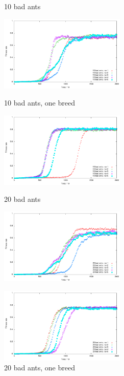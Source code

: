 \documentclass[titlepage, a4paper, 12pt]{article}
\begin{document}
\begin{figure}
  \begin{minipage}[b]{0.5\linewidth}
    \centering
    \caption{10 bad ants }\label{fig:images/graph10}
    \includegraphics[width=6cm]{images/graph10.pdf}
  \end{minipage}
  \begin{minipage}[b]{0.5\linewidth}
    \centering
    \caption{10 bad ants, one breed }\label{fig:images/graph10oneBreed}
    \includegraphics[width=6cm]{images/graph10oneBreed.pdf}
  \end{minipage}
  
  \hspace{0.5cm}

  \begin{minipage}[b]{0.5\linewidth}
    \centering
    \caption{20 bad ants }\label{fig:images/graph20}
    \includegraphics[width=6cm]{images/graph20.pdf}
  \end{minipage}
  \begin{minipage}[b]{0.5\linewidth}
    \centering
    \caption{20 bad ants, one breed }\label{fig:images/graph20oneBreed}
    \includegraphics[width=6cm]{images/graph20oneBreed.pdf}
  \end{minipage}
  

\end{figure}
\end{document}
